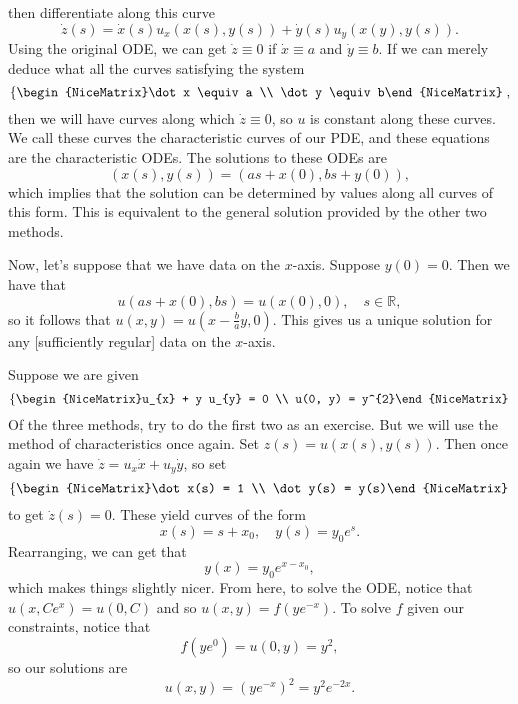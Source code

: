 \begin{enumerate}[(1)]
	then differentiate along this curve
	\[ \dot z(s) = \dot x (s) u_{x}(x(s), y(s)) + \dot y(s) u_{y}(x(y), y(s)). \]
	Using the original ODE, we can get \( \dot z \equiv 0 \) if \( \dot x \equiv a \) and \( \dot y \equiv b \).
	If we can merely deduce what all the curves satisfying the system
	\[ \left\{\begin{NiceMatrix}\dot x \equiv a \\ \dot y \equiv b\end{NiceMatrix}\right., \]
	then we will have curves along which \( \dot z \equiv 0 \), so \( u \) is constant along these curves. We call these curves the characteristic curves of our PDE, and these equations are the characteristic ODEs. The solutions to these ODEs are
	\[ (x(s), y(s)) = (as + x(0), bs + y(0)), \]
	which implies that the solution can be determined by values along all curves of this form. This is equivalent to the general solution provided by the other two methods.

	Now, let's suppose that we have data on the \( x \)-axis. Suppose \( y(0) = 0 \). Then we have that
	\[ u(as + x(0), bs) = u(x(0), 0), \quad s \in \mathbb{R}, \] 
	so it follows that \( u(x, y) = u(x - \frac{b}{a} y, 0) \). This gives us a unique solution for any [sufficiently regular] data on the \( x \)-axis.

\end{enumerate}

\begin{example}
	Suppose we are given
	\[ \left\{\begin{NiceMatrix}u_{x} + y u_{y} = 0 \\ u(0, y) = y^{2}\end{NiceMatrix}\right.  \]
	Of the three methods, try to do the first two as an exercise. But we will use the method of characteristics once again. Set \( z(s) = u(x(s), y(s)) \). Then once again we have \( \dot z = u_{x} \dot x + u_{y} \dot y \), so set
	\[ \left\{\begin{NiceMatrix}\dot x(s) = 1 \\ \dot y(s) = y(s)\end{NiceMatrix}\right. \]
	to get \( \dot z(s) = 0 \). These yield curves of the form
	\[ x(s) = s + x_{0}, \quad y(s) = y_{0}e^{s}. \]
	Rearranging, we can get that
	\[ y(x) = y_{0}e^{x-x_{0}}, \]
	which makes things slightly nicer. From here, to solve the ODE, notice that \( u(x, Ce^{x}) = u(0, C) \) and so \( u(x, y) = f(ye^{-x}) \). To solve \( f \) given our constraints, notice that
	\[ f(y e^{0}) = u(0, y) = y^{2}, \]
	so our solutions are
	\[ u(x, y) = \left( ye^{-x} \right)^{2} = y^{2} e^{-2x}. \]
\end{example}

